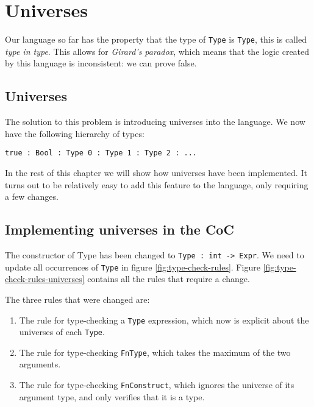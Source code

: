 \chapter{Universes}
\label{ch:universes}

Our language so far has the property that the type of \verb|Type| is \verb|Type|, this is called \emph{type in type}. This allows for \emph{Girard's paradox}, which means that the logic created by this language is inconsistent: we can prove false. 

\section{Universes}

The solution to this problem is introducing universes into the language. We now have the following hierarchy of types:
\begin{lstlisting}
true : Bool : Type 0 : Type 1 : Type 2 : ...
\end{lstlisting}

In the rest of this chapter we will show how universes have been implemented. It turns out to be relatively easy to add this feature to the language, only requiring a few changes.

\section{Implementing universes in the CoC}

The constructor of Type has been changed to \verb|Type : int -> Expr|. We need to update all occurrences of \verb|Type| in figure \ref{fig:type-check-rules}. Figure \ref{fig:type-check-rules-universes} contains all the rules that require a change.

The three rules that were changed are:
\begin{enumerate}
	\item The rule for type-checking a \verb|Type| expression, which now is explicit about the universes of each \verb|Type|.
	\item The rule for type-checking \verb|FnType|, which takes the maximum of the two arguments.
	\item The rule for type-checking \verb|FnConstruct|, which ignores the universe of its argument type, and only verifies that it is a type.
\end{enumerate}

